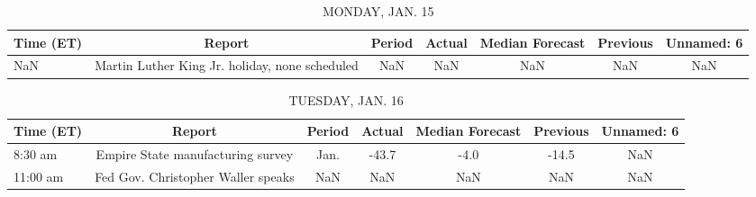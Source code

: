 \documentclass{article}%
\begin{document}
%
\normalsize%


\begin{table}[htbp]%
\caption{MONDAY, JAN. 15}%
\centering%
\begin{adjustbox}{width=1\textwidth}%
\begin{tabular}{lcccccc}
\toprule
Time (ET) &                                         Report & Period & Actual & Median Forecast & Previous & Unnamed: 6 \\
\midrule
      NaN & Martin Luther King Jr. holiday, none scheduled &    NaN &    NaN &             NaN &      NaN &        NaN \\
\bottomrule
\end{tabular}
%
\end{adjustbox}%
\end{table}

%


\begin{table}[htbp]%
\caption{TUESDAY, JAN. 16}%
\centering%
\begin{adjustbox}{width=1\textwidth}%
\begin{tabular}{lcccccc}
\toprule
Time (ET) &                             Report & Period & Actual & Median Forecast & Previous & Unnamed: 6 \\
\midrule
  8:30 am &  Empire State manufacturing survey &   Jan. &  -43.7 &            -4.0 &    -14.5 &        NaN \\
 11:00 am & Fed Gov. Christopher Waller speaks &    NaN &    NaN &             NaN &      NaN &        NaN \\
\bottomrule
\end{tabular}
%
\end{adjustbox}%
\end{table}

%
\end{document}
